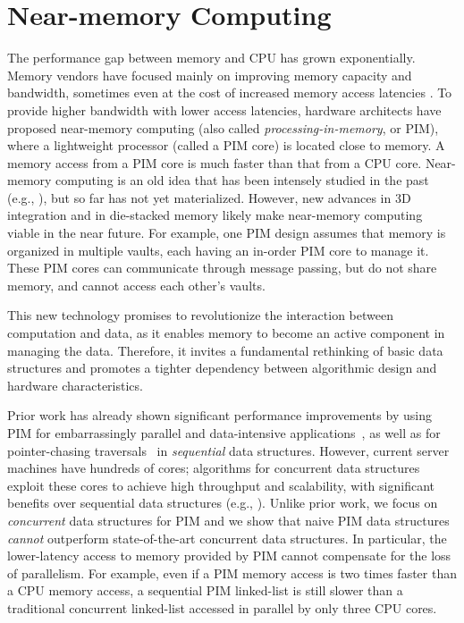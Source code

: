 \section{Near-memory Computing}

The performance gap between memory and CPU has grown exponentially.
Memory vendors have focused mainly on improving memory capacity and
bandwidth, sometimes even at the cost of increased memory access
latencies \cite{Chang:2016, DBLP:conf/hpca/LeeKSLSM13,
  DBLP:conf/hpca/LeeKPKSCM15, Chang:2017, Lee:2017}.  To provide
higher bandwidth with lower access latencies, hardware architects have
proposed near-memory computing (also called
\textit{processing-in-memory}, or PIM), where a lightweight processor
(called a PIM core) is located close to memory. A memory access from a
PIM core is much faster than that from a CPU core.  Near-memory
computing is an old idea that has been intensely studied in the past
(e.g., \cite{Stone1970, Kogge1994, Gokhale1995, Patterson1997,
  Oskin1998, KangHYKGLTP99, Hall1999, Elliott:1992}), but so far has
not yet materialized. However, new advances in 3D integration and in
die-stacked memory likely make near-memory computing viable in the
near future.  For example, one PIM design \cite{Ahn2015:2,
  Zhang2014:TTP, Ahn2015:1, boroumand2016} assumes that memory is
organized in multiple vaults, each having an in-order PIM core to
manage it.  These PIM cores can communicate through message passing,
but do not share memory, and cannot access each other's vaults.

This new technology promises to revolutionize the interaction between 
computation and data, 
as it enables memory to become an active component in managing the data. 
Therefore, it invites a fundamental rethinking of basic data structures and 
promotes a tighter dependency between algorithmic design and hardware 
characteristics. 

Prior work has already shown significant performance improvements by using PIM 
for embarrassingly parallel 
and data-intensive applications~\cite{Zhang2014:TTP, Ahn2015:2, ZhuASSHPF13, 
Akin2015:DRM, Hsieh:2016:TOM}, 
as well as for pointer-chasing traversals~\cite{hsieh2016accelerating} in 
\emph{sequential} data structures. 
However, current server machines have hundreds of cores; 
algorithms for concurrent data structures exploit these cores to achieve high 
throughput and scalability, 
with significant benefits over sequential data structures 
(e.g., \cite{practicallf, skiplists-concpugh, valois, Herlihy08}).
Unlike prior work, we focus on \emph{concurrent} data structures for PIM 
and we show that naive PIM data structures \emph{cannot} outperform 
state-of-the-art concurrent data structures. 
In particular, the lower-latency access to memory provided by PIM cannot 
compensate 
for the loss of parallelism. 
For example, even if a PIM memory access is two times faster than a CPU memory access, a 
sequential PIM linked-list is still slower than a traditional concurrent linked-list accessed in parallel by only three 
CPU cores.

